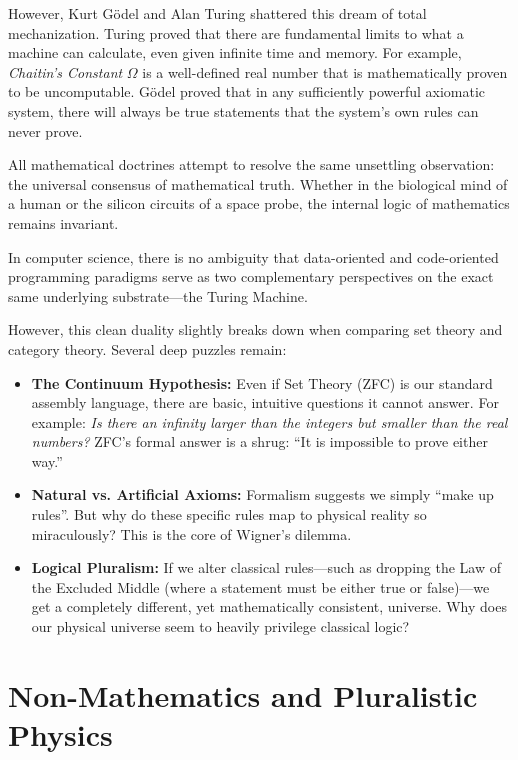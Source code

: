 However, Kurt G\"{o}del and Alan Turing shattered this dream of total mechanization.
Turing proved that there are fundamental limits to what a machine can calculate, even given infinite time and memory.
For example, \emph{Chaitin's Constant} $\Omega$ is a well-defined real number that is mathematically proven to be uncomputable.
G\"{o}del proved that in any sufficiently powerful axiomatic system, there will always be true statements that the system's own rules can never prove.

All mathematical doctrines attempt to resolve the same unsettling observation: the universal consensus of mathematical truth.
Whether in the biological mind of a human or the silicon circuits of a space probe, the internal logic of mathematics remains invariant.

In computer science, there is no ambiguity that data-oriented and code-oriented programming paradigms serve as two complementary perspectives on the exact same underlying substrate---the Turing Machine. 

However, this clean duality slightly breaks down when comparing set theory and category theory.
Several deep puzzles remain:

\begin{itemize}
\item \textbf{The Continuum Hypothesis:} Even if Set Theory (ZFC) is our standard assembly language, there are basic, intuitive questions it cannot answer.
  For example: \emph{Is there an infinity larger than the integers but smaller than the real numbers?} ZFC's formal answer is a shrug: ``It is impossible to prove either way.''
\item \textbf{Natural vs. Artificial Axioms:} Formalism suggests we simply ``make up rules''.
  But why do these specific rules map to physical reality so miraculously? This is the core of Wigner's dilemma.
\item \textbf{Logical Pluralism:} If we alter classical rules---such as dropping the Law of the Excluded Middle (where a statement must be either true or false)---we get a completely different, yet mathematically consistent, universe.
  Why does our physical universe seem to heavily privilege classical logic?
\end{itemize}



\section{Non-Mathematics and Pluralistic Physics}

